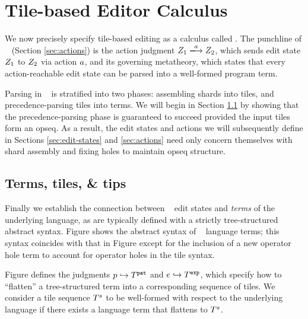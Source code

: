 
\section{Tile-based Editor Calculus}\label{sec:formalism}

We now precisely specify tile-based editing
as a calculus called \ty.
The punchline of \ty~ (Section \ref{sec:actions})
is the action judgment
$\performAction{\editState_1}{\action}{\editState_2}$,
which sends edit state $Z_1$ to $Z_2$
via action $a$, and its governing metatheory,
which states that every action-reachable edit state
can be parsed into a well-formed program term.

Parsing in \ty~ is stratified into two phases:
assembling shards into tiles, and precedence-parsing
tiles into terms.
We will begin in Section \ref{sec:terms-tiles-tips}
by showing that the precedence-parsing phase is
guaranteed to succeed provided the input tiles form
an opseq.
As a result, the edit states and actions we will
subsequently define in Sections \ref{sec:edit-states} and
\ref{sec:actions} need only concern themselves with
shard assembly and fixing holes to maintain opseq structure.



\subsection{Terms, tiles, \& tips} \label{sec:terms-tiles-tips}



% 


Finally we establish the connection between
\ty~ edit states and \emph{terms} of the
underlying language, as are typically defined
with a strictly tree-structured abstract syntax.
Figure  shows the abstract syntax of
\ty~ language terms;
this syntax coincides with that in Figure 
except for the inclusion of a new operator hole term
to account for operator holes in the tile syntax.

Figure  defines the judgments
$p\hookrightarrow T^{\texttt{pat}}$
and
$e\hookrightarrow T^{\texttt{exp}}$,
which specify how to ``flatten'' a tree-structured
term into a corresponding sequence of tiles.
We consider a tile sequence $T^s$ to be well-formed
with respect to the underlying language if there exists
a language term that flattens to $T^s$.

